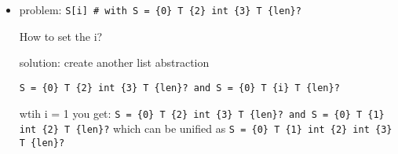 \documentclass[11pt]{article}
\begin{document}
\begin{itemize}
\item problem: \verb|S[i] # with S = {0} T {2} int {3} T {len}?|

How to set the i?

solution: create another list abstraction

\verb|S = {0} T {2} int {3} T {len}? and S = {0} T {i} T {len}?|

wtih i = 1 you get: \verb|S = {0} T {2} int {3} T {len}? and S = {0} T {1} int {2} T {len}?| which can be unified as \verb|S = {0} T {1} int {2} int {3} T {len}?|
\end{itemize}
\end{document}
